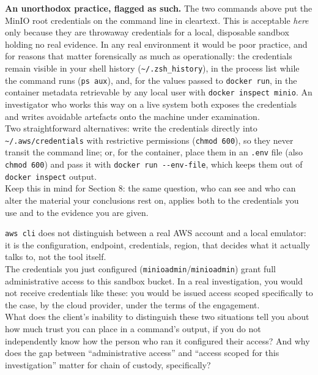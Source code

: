 \begin{warningbox}
\textbf{An unorthodox practice, flagged as such.} The two commands above put the MinIO root
credentials on the command line in cleartext. This is acceptable \emph{here} only because they are
throwaway credentials for a local, disposable sandbox holding no real evidence. In any real
environment it would be poor practice, and for reasons that matter forensically as much as
operationally: the credentials remain visible in your shell history
(\texttt{\textasciitilde/.zsh\_history}), in the process list while the command runs
(\texttt{ps aux}), and, for the values passed to \texttt{docker run}, in the container metadata
retrievable by any local user with \texttt{docker inspect minio}. An investigator who works this
way on a live system both exposes the credentials and writes avoidable artefacts onto the machine
under examination.\\
Two straightforward alternatives: write the credentials directly into
\texttt{\textasciitilde/.aws/credentials} with restrictive permissions
(\texttt{chmod 600}), so they never transit the command line; or, for the container, place them in
an \texttt{.env} file (also \texttt{chmod 600}) and pass it with
\texttt{docker run -\/-env-file}, which keeps them out of \texttt{docker inspect} output.\\
Keep this in mind for Section 8: the same question, who can see and who can alter the material
your conclusions rest on, applies both to the credentials you use and to the evidence you are
given.
\end{warningbox}

\begin{questionbox}
\texttt{aws cli} does not distinguish between a real AWS account and a local emulator: it is the configuration, endpoint, credentials, region, that decides what it actually talks to, not the tool itself. \\

The credentials you just configured (\texttt{minioadmin}/\texttt{minioadmin}) grant full administrative access to this sandbox bucket. In a real investigation, you would not receive credentials like these: you would be issued access scoped specifically to the case, by the cloud provider, under the terms of the engagement. \\

What does the client's inability to distinguish these two situations tell you about how much trust you can place in a command's output, if you do not independently know how the person who ran it configured their access? And why does the gap between ``administrative access'' and ``access scoped for this investigation'' matter for chain of custody, specifically?
\end{questionbox}

\begin{answerbox}
\vspace{2.5cm}
\end{answerbox}
